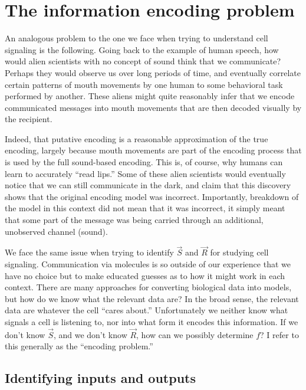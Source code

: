 \section{The information encoding problem}
\label{introduction:encoding}


An analogous problem to the one we face when trying to understand
cell signaling is the following.
Going back to the example of human speech, how would
alien scientists with no concept of sound think that we
communicate? Perhaps they would observe us over long periods of time, 
and eventually correlate certain patterns
of mouth movements by one human to some behavioral task
performed by another. These aliens
might quite reasonably infer that we encode
communicated messages into mouth movements that are then decoded visually
by the recipient.


Indeed, that putative encoding is a reasonable
approximation of the true encoding, largely because mouth movements
are part of the encoding process that is used by the full sound-based
encoding. This is, of course, why humans can learn to accurately ``read lips.''
Some of these alien scientists would eventually notice that we can
still communicate in the dark, and claim that this discovery shows that
the original encoding model was incorrect. Importantly, breakdown of the model
in this context did not mean that it was incorrect, it simply meant that
some part of the message was being carried through an additional, unobserved channel (sound).


We face the same issue when trying to identify $\vec{S}$ and
$\vec{R}$ for studying cell signaling. Communication via molecules
is so outside of our experience that we have no choice but to make
educated guesses as to how it might work in each context.
There are many approaches for converting biological
data into models, but how do we know what the relevant data
are? In the broad sense, the relevant data are whatever the
cell ``cares about.'' Unfortunately we neither know what
signals a cell is listening to, nor into what form it encodes
this information. If we don't know $\vec{S}$, and
we don't know $\vec{R}$, how can we possibly determine $f$?
I refer to this generally as the ``encoding problem.''


\subsection{Identifying inputs and outputs}


